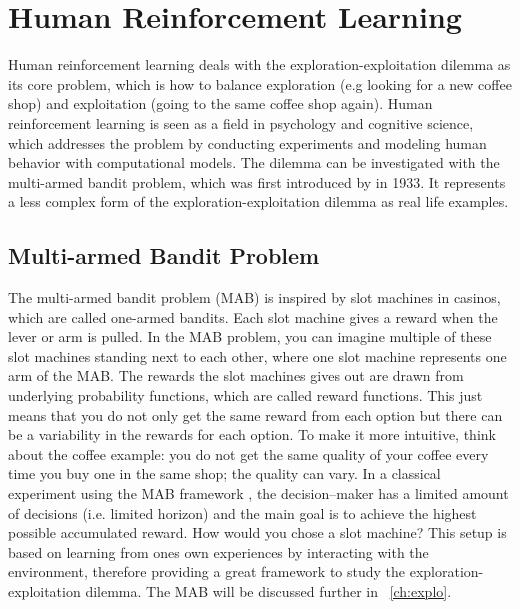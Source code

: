 \section{Human Reinforcement Learning}

Human reinforcement learning deals with the exploration-exploitation dilemma as its core problem, which is how to balance exploration (e.g looking for a new coffee shop) and exploitation (going to the same coffee shop again). Human reinforcement learning is seen as a field in psychology and cognitive science, which addresses the problem by conducting experiments and modeling human behavior with computational models. 
The dilemma can be investigated with the multi-armed bandit problem, which was first introduced by \cite{thompson1933likelihood} in 1933. It represents a less complex form of the exploration-exploitation dilemma as real life examples. 
   

\subsection{Multi-armed Bandit Problem}
The multi-armed bandit problem (MAB) is inspired by slot machines in casinos, which are called one-armed bandits. Each slot machine gives a reward when the lever or arm is pulled. In the MAB problem, you can imagine multiple of these slot machines standing next to each other, where one slot machine represents one arm of the MAB. 
The rewards the slot machines gives out are drawn from underlying probability functions, which are called reward functions. This just means that you do not only get the same reward from each option but there can be a variability in the rewards for each option. To make it more intuitive, think about the coffee example: you do not get the same quality of your coffee every time you buy one in the same shop; the quality can vary. 
In a classical experiment using the MAB framework \citep{cohen2007should, daw2006cortical, schulz2017putting}, the decision--maker has a limited amount of decisions (i.e. limited horizon) and the main goal is to achieve the highest possible accumulated reward.
How would you chose a slot machine?
This setup is based on learning from ones own experiences by interacting with the environment, therefore providing a great framework to study the exploration-exploitation dilemma. The MAB will be discussed further in ~\ref{ch:explo}.


